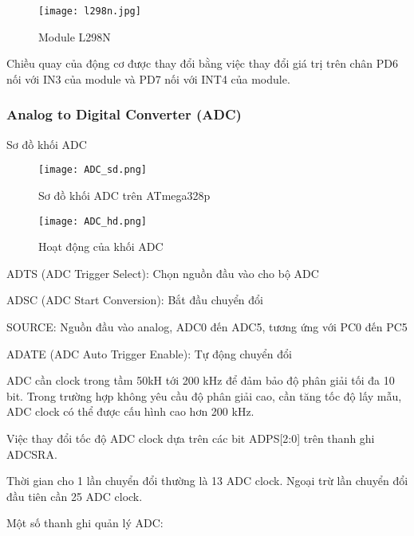\begin{figure}[h!]
	\centering
	\texttt{[image: l298n.jpg]}
	\caption[Module L298N]{Module L298N}
	\label{fig:Module L298N}
\end{figure}

Chiều quay của động cơ được thay đổi bằng việc thay đổi giá trị trên chân PD6 nối với IN3 của module và PD7 nối với INT4 của module.
\newpage

\subsubsection{Analog to Digital Converter (ADC)}

Sơ đồ khối ADC

\begin{figure}[h!]
	\centering
	\texttt{[image: ADC\_sd.png]}
	\caption[Sơ đồ khối ADC trên ATmega328p]{Sơ đồ khối ADC trên ATmega328p}
	\label{fig:Sơ đồ khối ADC trên ATmega328p}
\end{figure}

\begin{figure}[h!]
	\centering
	\texttt{[image: ADC\_hd.png]}
	\caption[Hoạt động của khối ADC]{Hoạt động của khối ADC}
	\label{fig:Hoạt động của khối ADC}
\end{figure}

ADTS (ADC Trigger Select): Chọn nguồn đầu vào cho bộ ADC

ADSC (ADC Start Conversion): Bắt đầu chuyển đổi

SOURCE: Nguồn đầu vào analog, ADC0 đến ADC5, tương ứng với PC0 đến PC5

ADATE (ADC Auto Trigger Enable): Tự động chuyển đổi

ADC cần clock trong tầm 50kH tới 200 kHz để đảm bảo độ phân giải tối đa 10 bit.
Trong trường hợp không yêu cầu độ phân giải cao, cần tăng tốc độ lấy mẫu, ADC clock có thể được cấu hình cao hơn 200 kHz.

Việc thay đổi tốc độ ADC clock dựa trên các bit ADPS[2:0] trên thanh ghi ADCSRA.

Thời gian cho 1 lần chuyển đổi thường là 13 ADC clock. Ngoại trừ lần chuyển đổi đầu tiên cần 25 ADC clock.
 
Một số thanh ghi quản lý ADC:
 
